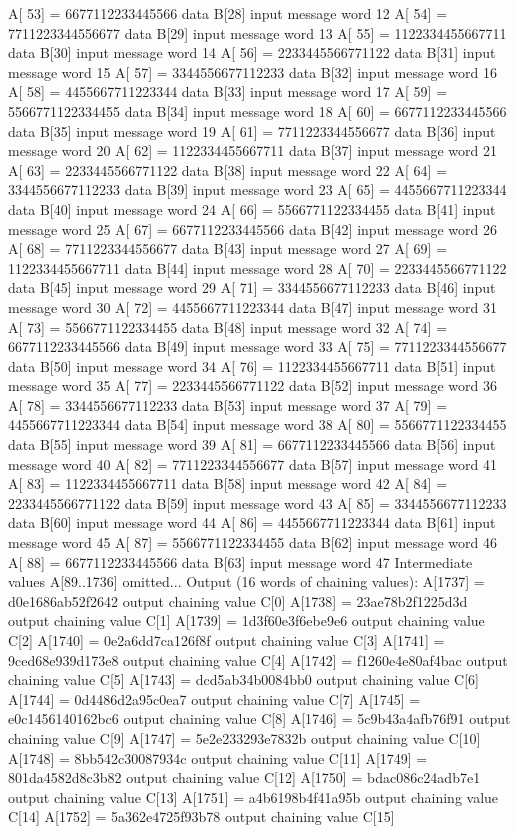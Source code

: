 A[  53] = 6677112233445566 data B[28] input message word   12
A[  54] = 7711223344556677 data B[29] input message word   13
A[  55] = 1122334455667711 data B[30] input message word   14
A[  56] = 2233445566771122 data B[31] input message word   15
A[  57] = 3344556677112233 data B[32] input message word   16
A[  58] = 4455667711223344 data B[33] input message word   17
A[  59] = 5566771122334455 data B[34] input message word   18
A[  60] = 6677112233445566 data B[35] input message word   19
A[  61] = 7711223344556677 data B[36] input message word   20
A[  62] = 1122334455667711 data B[37] input message word   21
A[  63] = 2233445566771122 data B[38] input message word   22
A[  64] = 3344556677112233 data B[39] input message word   23
A[  65] = 4455667711223344 data B[40] input message word   24
A[  66] = 5566771122334455 data B[41] input message word   25
A[  67] = 6677112233445566 data B[42] input message word   26
A[  68] = 7711223344556677 data B[43] input message word   27
A[  69] = 1122334455667711 data B[44] input message word   28
A[  70] = 2233445566771122 data B[45] input message word   29
A[  71] = 3344556677112233 data B[46] input message word   30
A[  72] = 4455667711223344 data B[47] input message word   31
A[  73] = 5566771122334455 data B[48] input message word   32
A[  74] = 6677112233445566 data B[49] input message word   33
A[  75] = 7711223344556677 data B[50] input message word   34
A[  76] = 1122334455667711 data B[51] input message word   35
A[  77] = 2233445566771122 data B[52] input message word   36
A[  78] = 3344556677112233 data B[53] input message word   37
A[  79] = 4455667711223344 data B[54] input message word   38
A[  80] = 5566771122334455 data B[55] input message word   39
A[  81] = 6677112233445566 data B[56] input message word   40
A[  82] = 7711223344556677 data B[57] input message word   41
A[  83] = 1122334455667711 data B[58] input message word   42
A[  84] = 2233445566771122 data B[59] input message word   43
A[  85] = 3344556677112233 data B[60] input message word   44
A[  86] = 4455667711223344 data B[61] input message word   45
A[  87] = 5566771122334455 data B[62] input message word   46
A[  88] = 6677112233445566 data B[63] input message word   47
Intermediate values A[89..1736] omitted... 
Output (16 words of chaining values):
A[1737] = d0e1686ab52f2642 output chaining value C[0]
A[1738] = 23ae78b2f1225d3d output chaining value C[1]
A[1739] = 1d3f60e3f6ebe9e6 output chaining value C[2]
A[1740] = 0e2a6dd7ca126f8f output chaining value C[3]
A[1741] = 9ced68e939d173e8 output chaining value C[4]
A[1742] = f1260e4e80af4bac output chaining value C[5]
A[1743] = dcd5ab34b0084bb0 output chaining value C[6]
A[1744] = 0d4486d2a95c0ea7 output chaining value C[7]
A[1745] = e0c1456140162bc6 output chaining value C[8]
A[1746] = 5c9b43a4afb76f91 output chaining value C[9]
A[1747] = 5e2e233293e7832b output chaining value C[10]
A[1748] = 8bb542c30087934c output chaining value C[11]
A[1749] = 801da4582d8c3b82 output chaining value C[12]
A[1750] = bdac086c24adb7e1 output chaining value C[13]
A[1751] = a4b6198b4f41a95b output chaining value C[14]
A[1752] = 5a362e4725f93b78 output chaining value C[15]

